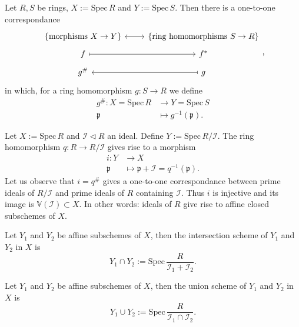 \begin{prop}
	Let $R,S$ be rings, $X := \mathrm{Spec}\, R$ and $Y := \mathrm{Spec}\, S$.
	Then there is a one-to-one correspondance
	\begin{equation}
		\begin{tikzcd}[row sep=tiny]
		\left\{ \text{morphisms } X \to Y \right\} \arrow[r, "", leftrightarrow] &
		\left\{ \text{ring homomorphisms } S \to R \right\}\\
		f \arrow[r, "", mapsto] & f^*\\
		g^\# & g \arrow[l, "", mapsto]
	\end{tikzcd}
	,\end{equation} 
	in which, for a ring homomorphism $g: S \to R$ we define
	\begin{align}
		g^{\#}: X = \mathrm{Spec}\, R &\to Y = \mathrm{Spec}\, S \\
		\mathfrak{p} &\mapsto g^{-1}(\mathfrak{p})
	.\end{align} 
\end{prop} 

\begin{ex}
	Let $X := \mathrm{Spec}\, R$ and $\mathcal{I} \triangleleft R$ an ideal.
	Define $Y := \mathrm{Spec}\, R/\mathcal{I}$.
	The ring homomorphism $q: R \to R/\mathcal{I}$ gives rise to a morphism
	\begin{align}
		i: Y &\to X \\
		\mathfrak{p} &\mapsto \mathfrak{p} + \mathcal{I} = q^{-1}(\mathfrak{p})
	.\end{align} 
	Let us observe that $i = q^{\#}$ gives a one-to-one correspondance
	between prime ideals of $R/\mathcal{I}$ and prime ideals of $R$ containing $\mathcal{I}$.
	Thus $i$ is injective and its image is $\mathbb{V}\left( \mathcal{I} \right) \subset X$.
	In other words: ideals of $R$ give rise to affine closed subschemes of $X$.
\end{ex} 

\begin{defn}
	Let $Y_1$ and $Y_2$ be affine subschemes of $X$, then the intersection scheme
	of $Y_1$ and $Y_2$ in $X$ is
	\begin{equation}
	Y_1 \cap Y_2 := \mathrm{Spec}\, \frac{R}{\mathcal{I}_1 + \mathcal{I}_2}
	.\end{equation} 
\end{defn}

\begin{defn}
	Let $Y_1$ and $Y_2$ be affine subschemes of $X$, then the union scheme
	of $Y_1$ and $Y_2$ in $X$ is
	\begin{equation}
	Y_1 \cup Y_2 := \mathrm{Spec}\, \frac{R}{\mathcal{I}_1 \cap \mathcal{I}_2}
	.\end{equation} 
\end{defn}

